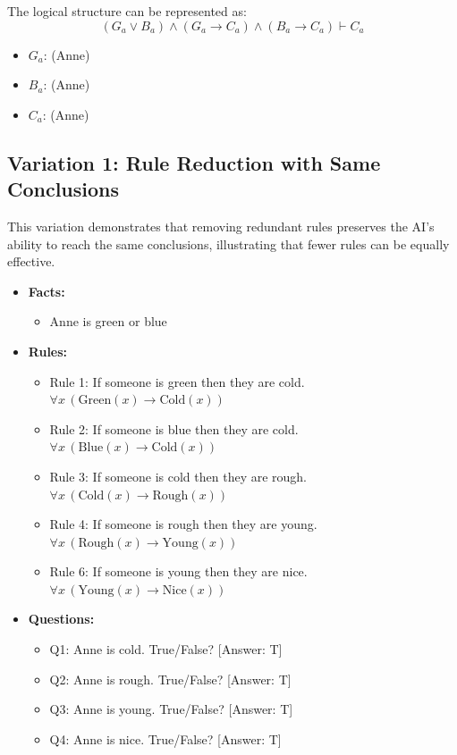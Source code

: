 \documentclass{article}
\begin{document}
The logical structure can be represented as:
\[
(G_a \lor B_a) \land (G_a \rightarrow C_a) \land (B_a \rightarrow C_a) \vdash C_a
\]

\begin{itemize}
    \item $G_a$: (Anne)
    \item $B_a$: (Anne)
    \item $C_a$: (Anne)
\end{itemize}


\subsection{Variation 1: Rule Reduction with Same Conclusions}

This variation demonstrates that removing redundant rules preserves the AI's ability to reach the same conclusions, illustrating that fewer rules can be equally effective.

\begin{itemize}
    \item \textbf{Facts:}
    \begin{itemize}
        \item Anne is green or blue
    \end{itemize}

    \item \textbf{Rules:}
    \begin{itemize}
        \item Rule 1: If someone is green then they are cold. $\forall x \, (\text{Green}(x) \rightarrow \text{Cold}(x))$
        \item Rule 2: If someone is blue then they are cold. $\forall x \, (\text{Blue}(x) \rightarrow \text{Cold}(x))$
        \item Rule 3: If someone is cold then they are rough. $\forall x \, (\text{Cold}(x) \rightarrow \text{Rough}(x))$
        \item Rule 4: If someone is rough then they are young. $\forall x \, (\text{Rough}(x) \rightarrow \text{Young}(x))$
        \item Rule 6: If someone is young then they are nice. $\forall x \, (\text{Young}(x) \rightarrow \text{Nice}(x))$
    \end{itemize}

    \item \textbf{Questions:}
    \begin{itemize}
        \item Q1: Anne is cold. True/False? [Answer: T]
        \item Q2: Anne is rough. True/False? [Answer: T]
        \item Q3: Anne is young. True/False? [Answer: T]
        \item Q4: Anne is nice. True/False? [Answer: T]
    \end{itemize}
\end{itemize}
\end{document}
